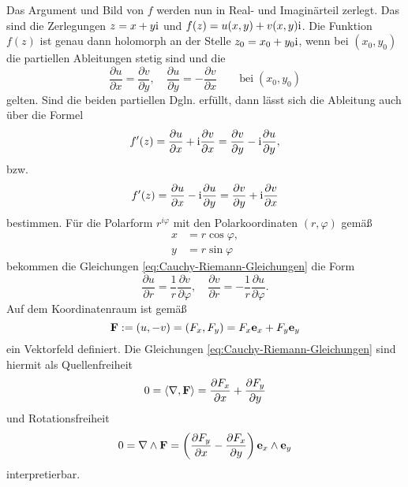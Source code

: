 \noindent
Das Argument und Bild von $f$ werden nun in Real- und Imaginärteil
zerlegt. Das sind die Zerlegungen $z=x+y\mathrm i$ und $f(z)=u(x,y)+v(x,y)\mathrm i$.
Die Funktion $f(z)$ ist genau dann holomorph an der Stelle
$z_0=x_0+y_0\mathrm i$, wenn bei $(x_0,y_0)$ die partiellen Ableitungen
stetig sind und die %
\begin{equation}\label{eq:Cauchy-Riemann-Gleichungen}
\frac{\partial u}{\partial x}=\frac{\partial v}{\partial y},
\quad \frac{\partial u}{\partial y}=-\frac{\partial v}{\partial x}
\qquad\text{bei}\;(x_0,y_0)
\end{equation}
gelten. Sind die beiden partiellen Dgln. erfüllt, dann lässt sich
die Ableitung auch über die Formel%
\begin{equation}
f'(z) = \frac{\partial u}{\partial x}+\mathrm i\frac{\partial v}{\partial x}
= \frac{\partial v}{\partial y}-\mathrm i\frac{\partial u}{\partial y},
\end{equation}
bzw.
\begin{equation}
f'(z) = \frac{\partial u}{\partial x}-\mathrm i\frac{\partial u}{\partial y}
= \frac{\partial v}{\partial y}+\mathrm i\frac{\partial v}{\partial x}
\end{equation}
bestimmen. Für die Polarform $r^{i\varphi}$ mit den Polarkoordinaten
$(r,\varphi)$ gemäß%
\begin{align}
x &= r\cos\varphi,\\
y &= r\sin\varphi
\end{align}
bekommen die Gleichungen \eqref{eq:Cauchy-Riemann-Gleichungen} die Form
\begin{equation}
\frac{\partial u}{\partial r} = \frac{1}{r}\frac{\partial v}{\partial\varphi}, \quad
\frac{\partial v}{\partial r} = -\frac{1}{r}\frac{\partial u}{\partial\varphi}.
\end{equation}
Auf dem Koordinatenraum ist gemäß
\begin{equation}
\mathbf{F}:= (u,-v) = (F_x,F_y) = F_x\mathbf{e}_x+F_y\mathbf{e}_y
\end{equation}
ein Vektorfeld definiert. Die Gleichungen
\eqref{eq:Cauchy-Riemann-Gleichungen} sind hiermit als
Quellenfreiheit
\begin{equation}
0=\langle\nabla,\mathbf{F}\rangle = \frac{\partial F_x}{\partial x}+\frac{\partial F_y}{\partial y}
\end{equation}
und Rotationsfreiheit
\begin{equation}
0=\nabla\wedge \mathbf{F} = \bigg(\frac{\partial F_y}{\partial x}
-\frac{\partial F_x}{\partial y}\bigg)\,\mathbf{e}_x\wedge\mathbf{e}_y
\end{equation}
interpretierbar.

